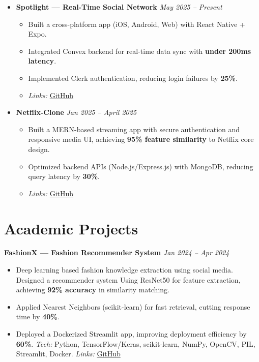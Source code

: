 \documentclass[10pt,a4paper]{article}
\begin{document}
	\begin{itemize}
		\item \textbf{Spotlight — Real-Time Social Network} \hfill \textit{May 2025 -- Present}
		\begin{itemize}
			\item Built a cross-platform app (iOS, Android, Web) with React Native + Expo.  
			\item Integrated Convex backend for real-time data sync with \textbf{under 200ms latency}.  
			\item Implemented Clerk authentication, reducing login failures by \textbf{25\%}.    
			\item \emph{Links:} \href{https://github.com/ValupadasuSaiabbhiram/SPOTLIGHT-APP}{GitHub}
		\end{itemize}
		
		\item \textbf{Netflix-Clone} \hfill \textit{Jan 2025 -- April 2025}
		\begin{itemize}
			\item Built a MERN-based streaming app with secure authentication and responsive media UI, achieving \textbf{95\% feature similarity} to Netflix core design.  
			\item Optimized backend APIs (Node.js/Express.js) with MongoDB, reducing query latency by \textbf{30\%}.  
			\item \emph{Links:} \href{https://github.com/ValupadasuSaiabbhiram/netflix-clone}{GitHub}
		\end{itemize}
			
	\end{itemize}
	

	\section*{Academic Projects}
	
	\textbf{FashionX — Fashion Recommender System} \hfill \textit{Jan 2024 -- Apr 2024}
	\begin{itemize}
		\item Deep learning based fashion knowledge extraction using social media. Designed a recommender system Using ResNet50 for feature extraction, achieving \textbf{92\% accuracy} in similarity matching.  
		\item Applied Nearest Neighbors (scikit-learn) for fast retrieval, cutting response time by \textbf{40\%}.  
		\item Deployed a Dockerized Streamlit app, improving deployment efficiency by \textbf{60\%}.  
		\emph{Tech:} Python, TensorFlow/Keras, scikit-learn, NumPy, OpenCV, PIL, Streamlit, Docker.   
		\emph{Links:} \href{https://github.com/ValupadasuSaiabbhiram/FashionX}{GitHub}
	\end{itemize}
	
\end{document}
